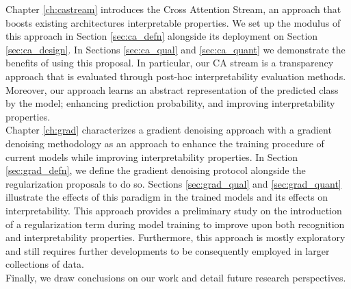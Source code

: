 \noindent Chapter \ref{ch:castream} introduces the Cross Attention Stream, an approach that boosts 
existing architectures interpretable properties. We set up the modulus of this approach in 
Section \ref{sec:ca_defn} alongside its deployment on Section \ref{sec:ca_design}. 
In Sections \ref{sec:ca_qual} and \ref{sec:ca_quant} we demonstrate the benefits of using this
proposal. In particular, our CA stream is a transparency approach that is evaluated through 
post-hoc interpretability evaluation methods. Moreover, our approach learns an abstract 
representation of the predicted class by the model; enhancing prediction probability, and improving 
interpretability properties.\\

\noindent Chapter \ref{ch:grad} characterizes a gradient denoising approach with a gradient denoising 
methodology as an approach to enhance the training procedure of current models while improving 
interpretability properties. In Section \ref{sec:grad_defn}, we define the gradient denoising 
protocol alongside the regularization proposals to do so.
Sections \ref{sec:grad_qual} and \ref{sec:grad_quant} illustrate the effects of this paradigm
in the trained models and its effects on interpretability. This approach provides a preliminary 
study on the introduction of a regularization term during model training to improve upon both 
recognition and interpretability properties. Furthermore, this approach is mostly exploratory and 
still requires further developments to be consequently employed in larger collections of data.\\
    
\noindent Finally, we draw conclusions on our work and detail future research perspectives.